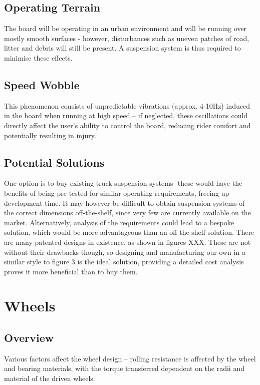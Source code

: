 \documentclass[journal,10pt]{IEEEtran}
\begin{document}
    \subsection{Operating Terrain}
        The board will be operating in an urban environment and will be running over mostly smooth surfaces - however, disturbances such as uneven patches of road, litter and debris will still be present. A suspension system is thus required to minimise these effects.
    \subsection{Speed Wobble}
        This phenomenon consists of unpredictable vibrations (approx. 4-10Hz) induced in the board when running at high speed – if neglected, these oscillations could directly affect the user’s ability to control the board, reducing rider comfort and potentially resulting in injury. 
    \subsection{Potential Solutions}
        One option is to buy existing truck suspension systems- these would have the benefits of being pre-tested for similar operating requirements, freeing up development time. It may however be difficult to obtain suspension systems of the correct dimensions off-the-shelf, since very few are currently available on the market. Alternatively, analysis of the requirements could lead to a bespoke solution, which would be more advantageous than an off the shelf solution.
        There are many patented designs in existence, as shown in figures XXX. These are not without their drawbacks though, so designing and manufacturing our own in a similar style to figure 3 is the ideal solution, providing a detailed cost analysis proves it more beneficial than to buy them.
        \begin{figure}[H]
            \centering
            \caption{}
            \label{fig:}
        \end{figure}
\section{Wheels}
    \subsection{Overview}
        Various factors affect the wheel design – rolling resistance is affected by the wheel and bearing materials, with the torque transferred dependent on the radii and material of the driven wheels.
\end{document}
